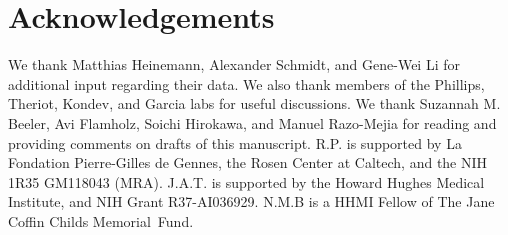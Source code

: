 \section{Acknowledgements}
We thank Matthias Heinemann, Alexander Schmidt, and Gene-Wei Li for additional
input regarding their data. We also thank members of the Phillips, Theriot,
Kondev, and Garcia labs for useful discussions. We thank Suzannah M. Beeler, Avi
Flamholz, Soichi Hirokawa, and Manuel Razo-Mejia for reading and providing
comments on drafts of this manuscript. R.P. is supported by La
Fondation Pierre-Gilles de Gennes, the Rosen Center at Caltech, and the NIH 1R35
GM118043 (MRA). J.A.T. is supported by the Howard Hughes Medical Institute, and
NIH Grant R37-AI036929. N.M.B is a HHMI Fellow of The Jane Coffin Childs Memorial Fund.
